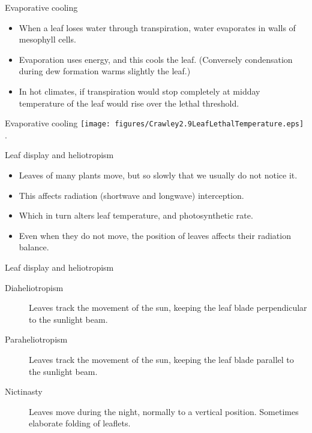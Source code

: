 \documentclass[10pt]{beamer}
\begin{document}
\begin{frame}{Evaporative cooling}
    \begin{itemize}
        \item When a leaf loses water through transpiration,
        water evaporates in walls of mesophyll cells.
        \item Evaporation uses energy, and this cools the leaf.
        (Conversely condensation during dew formation warms slightly
        the leaf.)
        \item In hot climates, if transpiration would stop completely
        at midday temperature of the leaf would rise over the lethal
        threshold.
    \end{itemize}
\end{frame}

\begin{frame}{Evaporative cooling}
    \centering\texttt{[image: figures/Crawley2.9LeafLethalTemperature.eps]}\\
    {\small \autocite[from][]{Crawley1997}.}
\end{frame}

\begin{frame}{Leaf display and heliotropism}
    \begin{itemize}
        \item Leaves of many plants move, but so slowly that we
        usually do not notice it.
        \item This affects radiation (shortwave and
        longwave) interception.
        \item Which in turn alters leaf temperature, and
        photosynthetic rate.
        \item Even when they do not move, the position of leaves
        affects their radiation balance.
    \end{itemize}
\end{frame}

\begin{frame}{Leaf display and heliotropism}
    \begin{description}
        \item[Diaheliotropism] Leaves track the movement of the
        sun, keeping the leaf blade perpendicular to the sunlight beam.
        \item[Paraheliotropism] Leaves track the movement of the
        sun, keeping the leaf blade parallel to the sunlight beam.
        \item[Nictinasty] Leaves move during the night, normally
        to a vertical position. Sometimes elaborate folding of
        leaflets.
    \end{description}
\end{frame}
\end{document}
